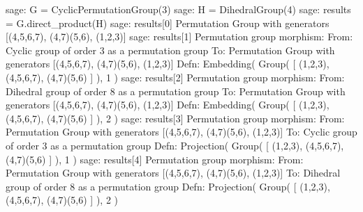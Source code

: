 \begin{sageexample}
sage: G = CyclicPermutationGroup(3)
sage: H = DihedralGroup(4)
sage: results = G.direct_product(H)
sage: results[0]
Permutation Group with generators [(4,5,6,7), (4,7)(5,6), (1,2,3)]
sage: results[1]
Permutation group morphism:
  From: Cyclic group of order 3 as a permutation group
  To:   Permutation Group with generators 
        [(4,5,6,7), (4,7)(5,6), (1,2,3)]
  Defn: Embedding( Group( [ (1,2,3), (4,5,6,7), (4,7)(5,6) ] ), 1 )
sage: results[2]
Permutation group morphism:
  From: Dihedral group of order 8 as a permutation group
  To:   Permutation Group with generators 
        [(4,5,6,7), (4,7)(5,6), (1,2,3)]
  Defn: Embedding( Group( [ (1,2,3), (4,5,6,7), (4,7)(5,6) ] ), 2 )
sage: results[3]
Permutation group morphism:
  From: Permutation Group with generators 
        [(4,5,6,7), (4,7)(5,6), (1,2,3)]
  To:   Cyclic group of order 3 as a permutation group
  Defn: Projection( Group( [ (1,2,3), (4,5,6,7), (4,7)(5,6) ] ), 1 )
sage: results[4]
Permutation group morphism:
  From: Permutation Group with generators 
        [(4,5,6,7), (4,7)(5,6), (1,2,3)]
  To:   Dihedral group of order 8 as a permutation group
  Defn: Projection( Group( [ (1,2,3), (4,5,6,7), (4,7)(5,6) ] ), 2 )
\end{sageexample}
%
\begin{sageverbatim}
\end{sageverbatim}
%
